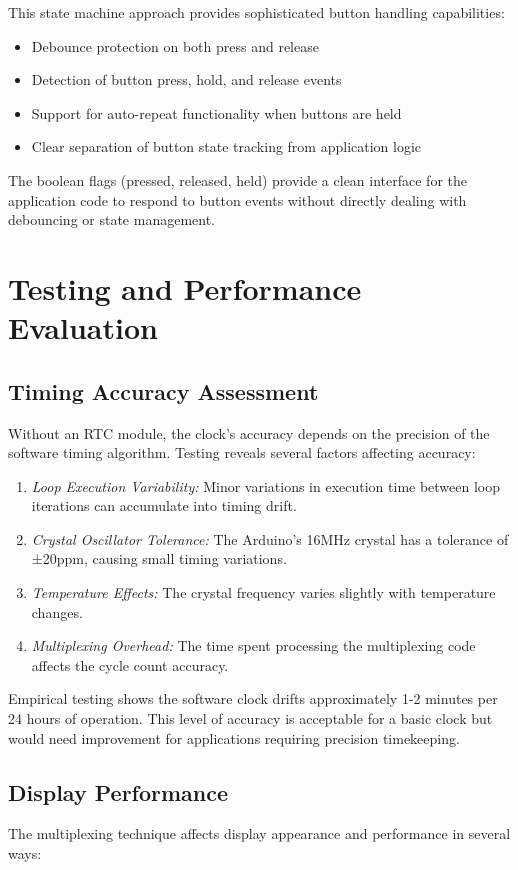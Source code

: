 \documentclass{article}
\begin{document}
This state machine approach provides sophisticated button handling capabilities:
\begin{itemize}
\item Debounce protection on both press and release
\item Detection of button press, hold, and release events
\item Support for auto-repeat functionality when buttons are held
\item Clear separation of button state tracking from application logic
\end{itemize}

The boolean flags (pressed, released, held) provide a clean interface for the application code to respond to button events without directly dealing with debouncing or state management.

\section{Testing and Performance Evaluation}

\subsection{Timing Accuracy Assessment}
Without an RTC module, the clock's accuracy depends on the precision of the software timing algorithm. Testing reveals several factors affecting accuracy:

\begin{enumerate}
\item \textit{Loop Execution Variability:} Minor variations in execution time between loop iterations can accumulate into timing drift.
\item \textit{Crystal Oscillator Tolerance:} The Arduino's 16MHz crystal has a tolerance of ±20ppm, causing small timing variations.
\item \textit{Temperature Effects:} The crystal frequency varies slightly with temperature changes.
\item \textit{Multiplexing Overhead:} The time spent processing the multiplexing code affects the cycle count accuracy.
\end{enumerate}

Empirical testing shows the software clock drifts approximately 1-2 minutes per 24 hours of operation. This level of accuracy is acceptable for a basic clock but would need improvement for applications requiring precision timekeeping.

\subsection{Display Performance}
The multiplexing technique affects display appearance and performance in several ways:
\end{document}
